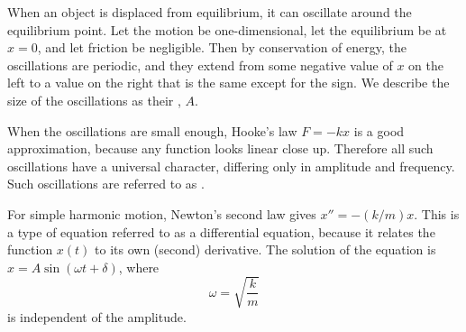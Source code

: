 When an object is displaced from equilibrium, it can oscillate around the
equilibrium point. Let the motion be one-dimensional, let the equilibrium
be at $x=0$, and let friction be negligible. Then by conservation of energy,
the oscillations are periodic, and they extend from some negative value of
$x$ on the left to a value on the right that is the same except for the sign.
We describe the size of the oscillations as their , $A$.

When the oscillations are small enough, Hooke's law
$F=-kx$ is a good approximation, because any function looks linear close up.
Therefore all such oscillations have a universal character, differing only
in amplitude and frequency. Such oscillations are referred to as
.

For simple harmonic motion, Newton's second law gives $x''=-(k/m)x$.
This is a type of equation referred to as a differential equation, because it
relates the function $x(t)$ to its own (second) derivative. The solution
of the equation is $x=A\sin(\omega t+\delta)$, where
\begin{equation*}
  \omega = \sqrt{\frac{k}{m}}
\end{equation*}
is independent of the amplitude.
